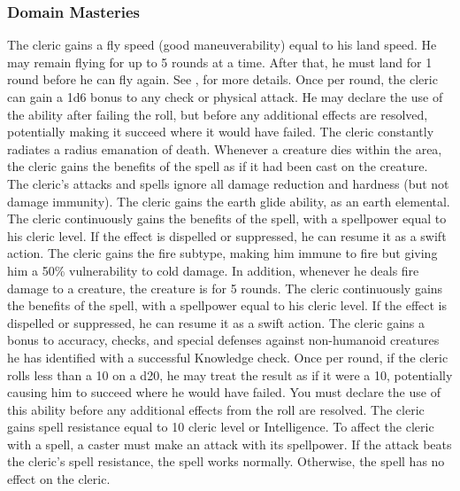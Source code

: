 \subsubsection{Domain Masteries}\label{Domain Masteries}

The cleric gains a fly speed (good maneuverability) equal to his land speed.
He may remain flying for up to 5 rounds at a time.
After that, he must land for 1 round before he can fly again.
See , for more details.
Once per round, the cleric can gain a \plus1d6 bonus to any check or physical attack.
He may declare the use of the ability after failing the roll, but before any additional effects are resolved, potentially making it succeed where it would have failed.
The cleric constantly radiates a \areamed radius emanation of death.
Whenever a creature dies within the area, the cleric gains the benefits of the  spell as if it had been cast on the creature.
The cleric's attacks and spells ignore all damage reduction and hardness (but not damage immunity).
The cleric gains the earth glide ability, as an earth elemental.
 The cleric continuously gains the benefits of the 
spell, with a spellpower equal to his cleric level.
If the effect is dispelled or suppressed, he can resume it as a swift action.
The cleric gains the fire subtype, making him immune to fire but giving him a 50\% vulnerability to cold damage.
In addition, whenever he deals fire damage to a creature, the creature is \ignited for 5 rounds.
 The cleric continuously gains the benefits of the 
spell, with a spellpower equal to his cleric level.
If the effect is dispelled or suppressed, he can resume it as a swift action.
The cleric gains a  bonus to accuracy, checks, and special defenses against non-humanoid creatures he has identified with a successful Knowledge check.
Once per round, if the cleric rolls less than a 10 on a d20, he may treat the result as if it were a 10, potentially causing him to succeed where he would have failed.
You must declare the use of this ability before any additional effects from the roll are resolved.
The cleric gains spell resistance equal to 10 \add cleric level or Intelligence.
To affect the cleric with a spell, a caster must make an attack with its spellpower.
If the attack beats the cleric's spell resistance, the spell works normally.
Otherwise, the spell has no effect on the cleric.

